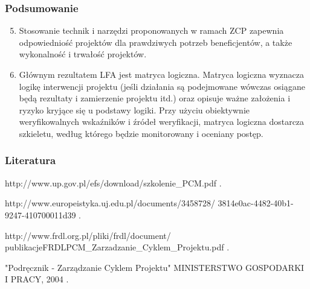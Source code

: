 \documentclass{beamer}
\begin{document}
\begin{frame}\frametitle{Podsumowanie}
	\begin{enumerate}
	   \setcounter{enumi}{4}
	   
        \item Stosowanie technik i narzędzi proponowanych w ramach ZCP zapewnia odpowiedniość projektów dla prawdziwych potrzeb beneficjentów, a także wykonalność i trwałość projektów. 

        \item Głównym rezultatem LFA jest matryca logiczna. Matryca logiczna wyznacza logikę interwencji projektu (jeśli działania są podejmowane wówczas osiągane będą rezultaty i zamierzenie projektu itd.) oraz opisuje ważne założenia i ryzyko kryjące się u podstawy logiki. Przy użyciu obiektywnie weryfikowalnych wskaźników i źródeł weryfikacji, matryca logiczna dostarcza szkieletu, według którego będzie monitorowany i oceniany postęp.


	\end{enumerate}
\end{frame}

\begin{frame}\frametitle{Literatura}

    \begin{thebibliography}{1}

           http://www.up.gov.pl/efs/download/szkolenie\_PCM.pdf .
        
          http://www.europeistyka.uj.edu.pl/documents/3458728/
          3814e0ac-4482-40b1-9247-410700011d39 .
        
          http://www.frdl.org.pl/pliki/frdl/document/
          publikacjeFRDL\/PCM\_Zarzadzanie\_Cyklem\_Projektu.pdf .
        
          "Podręcznik - Zarządzanie Cyklem Projektu"     MINISTERSTWO GOSPODARKI I PRACY, 2004 .

    \end{thebibliography}
         

\end{frame}
\end{document}
